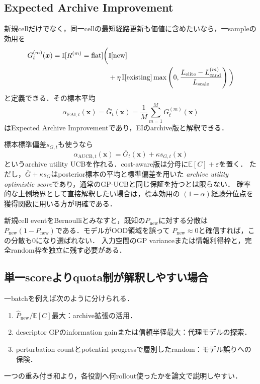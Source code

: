 \documentclass[a4paper,11pt]{ltjsarticle}
\newcommand{\E}{\mathbb E}
\newcommand{\ind}{\mathbb I}
\begin{document}
\subsection{Expected Archive Improvement}

新規cellだけでなく，同一cellの最短経路更新も価値に含めたいなら，一sampleの効用を
\begin{align}
  G_t^{(m)}(\bm x)
  =\ind[R^{(m)}=\mathrm{flat}]\bigg(&
  \ind[\mathrm{new}]\notag\\
  &+\eta\,\ind[\mathrm{existing}]
  \max\left(0,
  \frac{L_{\mathrm{elite}}-L_{\mathrm{cand}}^{(m)}}{L_{\mathrm{scale}}}
  \right)\bigg)
  \label{eq:archive-sample-utility}
\end{align}
と定義できる．その標本平均
\begin{equation}
  \alpha_{\mathrm{EAI},t}(\bm x)
  =\bar G_t(\bm x)=\frac1M\sum_{m=1}^M G_t^{(m)}(\bm x)
  \label{eq:expected-archive-improvement}
\end{equation}
はExpected Archive Improvementであり，EIのarchive版と解釈できる．

標本標準偏差\(s_{G,t}\)も使うなら
\begin{equation}
  \alpha_{\mathrm{AUCB},t}(\bm x)
  =\bar G_t(\bm x)+\kappa s_{G,t}(\bm x)
  \label{eq:archive-utility-ucb}
\end{equation}
というarchive utility UCBを作れる．cost-aware版は分母に\(\E[C]+\varepsilon\)を置く．
ただし，\(\bar G+\kappa s_G\)はposterior標本の平均と標準偏差を用いた
\emph{archive utility optimistic score}であり，通常のGP-UCBと同じ保証を持つとは限らない．
確率的な上側境界として直接解釈したい場合は，標本効用の
\((1-\alpha)\)経験分位点を獲得関数に用いる方が明確である．

\begin{cautionbox}[Bernoulli分散だけでは未知basinを救えない]
新規cell eventをBernoulliとみなすと，既知の\(P_{\mathrm{new}}\)に対する分散は
\(P_{\mathrm{new}}(1-P_{\mathrm{new}})\)である．モデルがOOD領域を誤って
\(P_{\mathrm{new}}\approx0\)と確信すれば，この分散も0になり選ばれない．
入力空間のGP varianceまたは情報利得枠と，完全random枠を独立に残す必要がある．
\end{cautionbox}

\subsection{単一scoreよりquota制が解釈しやすい場合}

一batchを例えば次のように分けられる．
\begin{enumerate}
  \item \(\widehat P_{\mathrm{new}}/\E[C]\)最大：archive拡張の活用．
  \item descriptor GPのinformation gainまたは信頼半径最大：代理モデルの探索．
  \item perturbation countとpotential progressで層別したrandom：モデル誤りへの保険．
\end{enumerate}
一つの重み付き和より，各役割へ何rollout使ったかを論文で説明しやすい．
\end{document}

